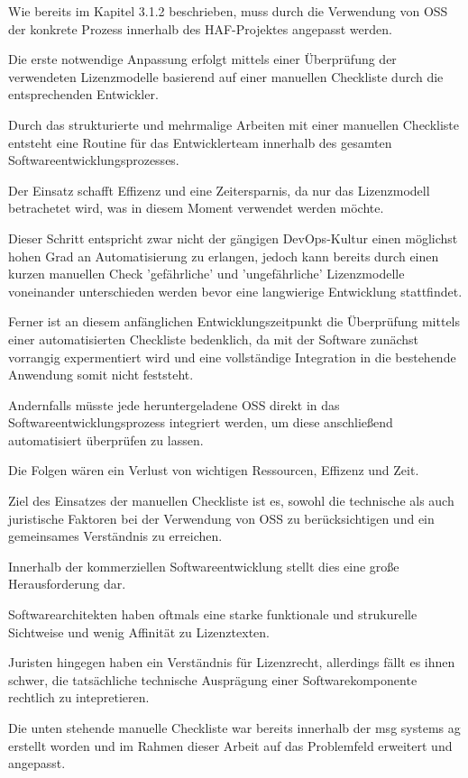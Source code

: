 Wie bereits im Kapitel 3.1.2 beschrieben, muss durch die Verwendung von OSS der konkrete Prozess innerhalb des HAF-Projektes angepasst werden. 

Die erste notwendige Anpassung erfolgt mittels einer Überprüfung der verwendeten Lizenzmodelle basierend auf einer manuellen Checkliste durch die entsprechenden Entwickler.  

Durch das strukturierte und mehrmalige Arbeiten mit einer manuellen Checkliste entsteht eine Routine für das Entwicklerteam innerhalb des gesamten Softwareentwicklungsprozesses. 

Der Einsatz schafft Effizenz und eine Zeitersparnis, da nur das Lizenzmodell betrachetet wird, was in diesem Moment verwendet werden möchte. 

Dieser Schritt entspricht zwar nicht der gängigen DevOps-Kultur einen möglichst hohen Grad an Automatisierung zu erlangen, jedoch kann bereits durch einen kurzen manuellen Check 'gefährliche' und 'ungefährliche' Lizenzmodelle voneinander unterschieden werden bevor eine langwierige Entwicklung stattfindet. 

Ferner ist an diesem anfänglichen Entwicklungszeitpunkt die Überprüfung mittels einer automatisierten Checkliste bedenklich, da mit der Software zunächst vorrangig expermentiert wird und eine vollständige Integration in die bestehende Anwendung somit nicht feststeht.

Andernfalls müsste jede heruntergeladene OSS direkt in das Softwareentwicklungsprozess integriert werden, um diese anschließend automatisiert überprüfen zu lassen.

Die Folgen wären ein Verlust von wichtigen Ressourcen, Effizenz und Zeit.

Ziel des Einsatzes der manuellen Checkliste ist es, sowohl die technische als auch juristische Faktoren bei der Verwendung von OSS zu berücksichtigen und ein gemeinsames Verständnis zu erreichen.

Innerhalb der kommerziellen Softwareentwicklung stellt dies eine große Herausforderung dar.

Softwarearchitekten haben oftmals eine starke funktionale und strukurelle Sichtweise und wenig Affinität zu Lizenztexten. 

Juristen hingegen haben ein Verständnis für Lizenzrecht, allerdings fällt es ihnen schwer, die tatsächliche technische Ausprägung einer Softwarekomponente rechtlich zu intepretieren. 

Die unten stehende manuelle Checkliste war bereits innerhalb der msg systems ag erstellt worden und im Rahmen dieser Arbeit auf das Problemfeld erweitert und angepasst.

